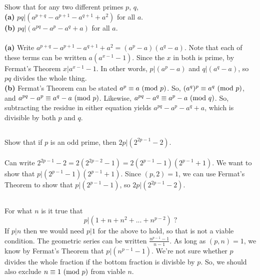 \documentclass{article}
\begin{document}
\subsection{}
Show that for any two different primes $p$, $q$,\\
\textbf{(a)} $pq|(a^{p+q} - a^{p+1} - a^{q+1} + a^2)$ for all $a$.\\
\textbf{(b)} $pq|(a^{pq} - a^p - a^q + a)$ for all $a$.\\~\\
\textbf{(a)}
Write $a^{p+q} - a^{p+1} - a^{q+1} + a^2 = (a^p - a)(a^q - a)$.
Note that each of these terms can be written $a(a^{x - 1} - 1)$.
Since the $x$ in both is prime, by Fermat's Theorem $x|a^{x - 1} - 1$.
In other words, $p|(a^p - a)$ and $q|(a^q - a)$, so $pq$ divides the whole thing.\\
\textbf{(b)}
Fermat's Theorem can be stated $a^p \equiv a \ (\mathrm{mod}\ p)$.
So, $(a^q)^p \equiv a^q \ (\mathrm{mod}\ p)$, and $a^{pq} - a^p \equiv a^q - a \ (\mathrm{mod}\ p)$.
Likewise, $a^{pq} - a^q \equiv a^p - a \ (\mathrm{mod}\ q)$.
So, subtracting the residue in either equation yields $a^{pq} - a^p - a^q + a$,
which is divisible by both $p$ and $q$.

\subsection{}
Show that if $p$ is an odd prime, then $2p|(2^{2p-1} - 2)$.\\~\\
Can write $2^{2p-1} - 2 = 2(2^{2p-2} - 1) = 2(2^{p-1} - 1)(2^{p-1} + 1)$.
We want to show that $p|(2^{p-1} - 1)(2^{p-1} + 1)$.
Since $(p, 2) = 1$, we can use Fermat's Theorem to show that $p|(2^{p-1} - 1)$,
so $2p|(2^{2p-1} - 2)$.

\subsection{}
For what $n$ is it true that
\begin{equation*}
    p|(1 + n + n^2 + ... + n^{p - 2}) \; ?
\end{equation*}
If $p|n$ then we would need $p|1$ for the above to hold, so that is not a viable condition.
The geometric series can be written $\frac{n^{p - 1} - 1}{n - 1}$.
As long as $(p, n) = 1$, we know by Fermat's Theorem that $p|(n^{p - 1} - 1)$.
We're not sure whether $p$ divides the whole fraction if the bottom fraction is
divisble by $p$. So, we should also exclude $n \equiv 1 \ (\mathrm{mod}\ p)$ from viable $n$.
\end{document}
